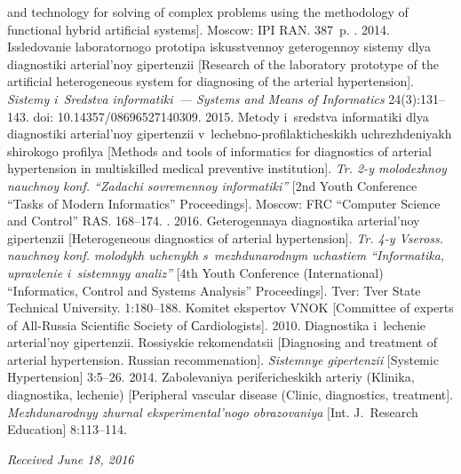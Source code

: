 \begin{multicols}{2}
{{\begin{thebibliography}{99}
and technology for solving of complex problems using the methodology of functional hybrid 
artificial systems]. Moscow: IPI RAN. 387~p.
. 2014. Issledovanie 
laboratornogo prototipa iskusstvennoy geterogennoy sistemy dlya diagnostiki arterial'noy 
gipertenzii [Research of the laboratory prototype of the artificial heterogeneous system for 
diagnosing of the arterial hypertension]. \textit{Sistemy i~Sredstva informatiki~--- Systems and 
Means of Informatics} 24(3):131--143. doi: 10.14357/08696527140309.
 2015. Metody i~sredstva informatiki dlya diagnostiki 
arterial'noy gipertenzii v~lechebno-profilakticheskikh uchrezhdeniyakh shirokogo profilya 
[Methods and tools of informatics for diagnostics of arterial hypertension in multiskilled 
medical preventive institution]. \textit{Tr. 2-y molodezhnoy nauchnoy konf. ``Zadachi 
sovremennoy informatiki''} [2nd Youth Conference ``Tasks of Modern Informatics'' 
Proceedings]. Moscow: FRC ``Computer Science and Control'' RAS. 168--174.
. 2016. Geterogennaya diagnostika arterial'noy 
gipertenzii [Heterogeneous diagnostics of arterial hypertension]. \textit{Tr. 4-y Vseross. 
nauchnoy konf. molodykh uchenykh s~mezhdunarodnym uchastiem ``Informatika, 
upravlenie i~sistemnyy analiz''} [4th Youth Conference (International) ``Informatics, Control 
and Systems Analysis'' Proceedings]. Tver: Tver State Technical University. 1:180--188.
Komitet ekspertov VNOK [Committee of experts of All-Russia Scientific Society of Сardiologists]. 
2010. Diagnostika i~lechenie arterial'noy gipertenzii. Rossiyskie 
rekomendatsii [Diagnosing and treatment of arterial 
hypertension. Russian recommenation]. 
\textit{Sistemnye gipertenzii} [Systemic Hypertension] 3:5--26. 
 2014. Zabolevaniya perifericheskikh arteriy (Klinika, 
diagnostika, lechenie) [Peripheral vascular disease (Clinic, diagnostics, treatment]. 
\textit{Mezhdunarodnyy zhurnal eksperimental'nogo obrazovaniya} [Int. J.~Research 
Education] 8:113--114. 
   \end{thebibliography}

 }
 }

\end{multicols}

\vspace*{-9pt}

\hfill{\small\textit{Received June 18, 2016}}

